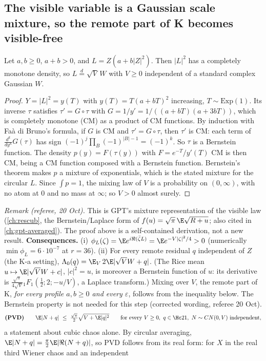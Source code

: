 \subsection{The visible variable is a Gaussian scale mixture, so the remote part of K becomes visible-free}
\begin{lemma}[\st{P}]\label{lem:gsm}
Let $a,b\ge0$, $a+b>0$, and $L=Z(a+b|Z|^2)$. Then $|L|^2$ has a completely monotone density, so $L\overset d=\sqrt V\,W$ with $V\ge0$ independent of a standard complex Gaussian $W$.
\end{lemma}
\begin{proof}
$Y=|L|^2=y(T)$ with $y(T)=T(a+bT)^2$ increasing, $T\sim\mathrm{Exp}(1)$. Its inverse $\tau$ satisfies $\tau'=G\circ\tau$ with $G=1/y'=1/((a+bT)(a+3bT))$, which is completely monotone (CM)
as a product of CM functions. By induction with Faà di Bruno's formula, if $G$ is CM and $\tau'=G\circ\tau$, then $\tau'$ is CM: each term of $\frac{d^k}{dy^k}G(\tau)$ has sign
$(-1)^j\prod_B(-1)^{|B|-1}=(-1)^k$. So $\tau$ is a Bernstein function. The density $p(y)=F(\tau(y))$ with $F=e^{-T}/y'(T)$ CM is then CM, being a CM function composed with a Bernstein
function. Bernstein's theorem makes $p$ a mixture of exponentials, which is the stated mixture for the circular $L$. Since $\int p=1$, the mixing law of $V$ is a probability on $(0,\infty)$,
with no atom at $0$ and no mass at $\infty$; so $V>0$ almost surely.
\end{proof}
\emph{Remark (referee, 20 Oct).} This is GPT's mixture representation of the visible law (\autoref{ch:rescub}, the Bernstein/Laplace form of $f(u)=\sqrt\pi\,\E\sqrt{R+u}$; also cited in
\autoref{ch:gpt-averaged}). The proof above is a self-contained derivation, not a new result.
\textbf{Consequences.} (i) $\phi_L(\zeta)=\E e^{i\Re(\bar\zeta L)}=\E e^{-V|\zeta|^2/4}>0$ (numerically $\min\phi_L=6\cdot10^{-7}$ at $r=36$). (ii) For every remote residual $q$ independent
of $Z$ (the K-a setting), $\Lambda_0(q)=\E_V\,2\E|\sqrt VW+q|$. (The Rice mean $u\mapsto\E|\sqrt VW+c|$, $|c|^2=u$, is moreover a Bernstein function of $u$: its derivative is $\frac{\sqrt\pi}{4\sqrt V}{}_1F_1(\tfrac12;2;-u/V)$, a Laplace transform.)
Mixing over $V$, the remote part of K, \emph{for every profile $a,b\ge0$ and every $\varepsilon$}, follows from the inequality below. The Bernstein property is not needed for this
step (corrected wording, referee 20 Oct).
\[
\textbf{(PVD)}\qquad \E|N+q|\ \le\ \tfrac{\sqrt\pi}2\sqrt{V+\E|q|^2}\qquad\text{for every }V\ge0,\ q\in\Hc21,\ N\sim CN(0,V)\text{ independent},
\]
a statement about cubic chaos alone. By circular averaging, $\E|N+q|=\tfrac\pi2\E|\Re(N+q)|$, so PVD follows from its real form: for $X$ in the real third Wiener chaos and an independent
